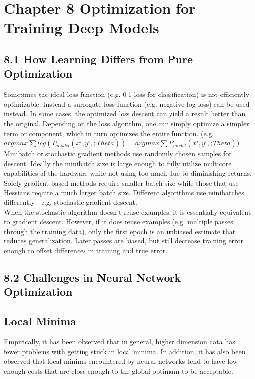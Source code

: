 \documentclass[a4paper]{report}
\begin{document}
\section{Chapter 8 Optimization for Training Deep Models}
\subsection{8.1 How Learning Differs from Pure Optimization}
Sometimes the ideal loss function (e.g. 0-1 loss for classification) is not efficiently optimizable. Instead a surrogate loss function (e.g. negative log loss) can be used instead. In some cases, the optimized loss descent can yield a result better than the original. Depending on the loss algorithm, one can simply optimize a simpler term or component, which in turn optimizes the entire function. (e.g. $argmax\sum log(P_{model}(x^i,y^i,;Theta))=argmax\sum P_{model}(x^i,y^i,;Theta)$)\\
Minibatch or stochastic gradient methods use randomly chosen samples for descent. Ideally the minibatch size is large enough to fully utilize multicore capabilities of the hardware while not using too much due to diminishing returns. Solely gradient-based methods require smaller batch size while those that use Hessians require a much larger batch size. Different algorithms use minibatches differently - e.g. stochastic gradient descent.\\
When the stochastic algorithm doesn't reuse examples, it is essentially equivalent to gradient descent. However, if it does reuse examples (e.g. multiple passes through the training data), only the first epoch is an unbiased estimate that reduces generalization. Later passes are biased, but still decrease training error enough to offset differences in training and true error.

\subsection{8.2 Challenges in Neural Network Optimization}
\subsection{Local Minima}
Empirically, it has been observed that in general, higher dimension data has fewer problems with getting stuck in local minima. In addition, it has also been observed that local minima encountered by neural networks tend to have low enough costs that are close enough to the global optimum to be acceptable.
\end{document}
